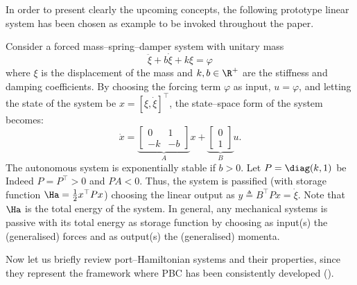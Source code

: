 %
In order to present clearly the upcoming concepts, the following prototype linear system has been chosen as example to be invoked throughout the paper.
%
\begin{exmp}\label{ex:msd_sys}
    Consider a forced mass--spring--damper system with unitary mass
    \[\ddot{\xi} + b\dot{\xi} + k\xi =\varphi\]
    where $\xi$ is the displacement of the mass and $k,b\in\R^+$ are the stiffness and damping coefficients. By choosing the forcing term $\varphi$ as input, $u = \varphi$, and letting the state of the system be $x = [\xi,\dot{\xi}]^\top$, the state--space form of the system becomes:
    \[\dot{x} = \underbrace{\begin{bmatrix}0&1\\-k&-b\end{bmatrix}}_Ax+ \underbrace{\begin{bmatrix}0\\1\end{bmatrix}}_Bu.\]
    The autonomous system is exponentially stable if $b>0$. Let $P=\diag({k,1})$ be 
    Indeed $P=P^\top>0$ and $PA<0$. Thus, the system is passified (with storage function $\Ha = \frac{1}{2}x^\top Px$) choosing the linear output as $y \triangleq B^\top Px = \dot{\xi}$. Note that $\Ha$ is the total energy of the system. In general, any mechanical systems is passive with its total energy as storage function by choosing as input(s) the (generalised) forces and as output(s) the (generalised) momenta.
\end{exmp}
%
Now let us briefly review port--Hamiltonian systems and their properties, since they represent the framework where PBC has been consistently developed (\cite{ortega2001putting}).

